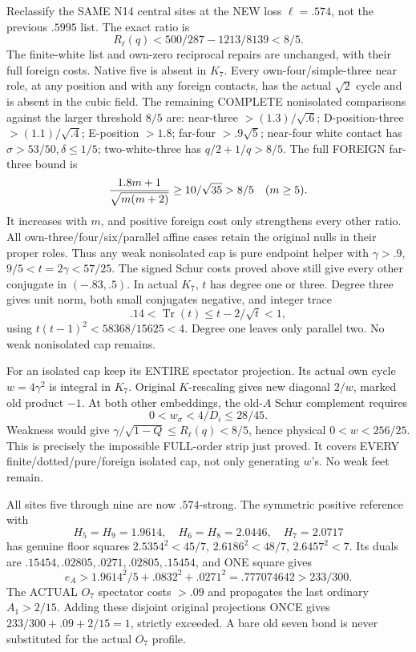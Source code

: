 \documentclass[11pt]{article}
\begin{document}
Reclassify the SAME N14 central sites at the
NEW loss \(\ell=.574\), not the previous
\(.5995\) list.
The exact ratio is
\[
 R_\ell(q)<500/287-1213/8139<8/5 .
\]
The finite-white list and own-zero reciprocal
repairs are unchanged, with their full foreign
costs.
Native five is absent in \(K_7\).
Every own-four/simple-three near role, at
any position and with any foreign contacts,
has the actual \(\sqrt2\) cycle and is absent
in the cubic field.
The remaining COMPLETE nonisolated comparisons
against the larger threshold \(8/5\) are:
near-three \(>(1.3)/\sqrt{.6}\);
D-position-three \(>(1.1)/\sqrt{.4}\);
E-position \(>1.8\);
far-four \(>.9\sqrt5\);
near-four white contact has
\(\sigma>53/50,\delta\le1/5\);
two-white-three has \(q/2+1/q>8/5\).
The full FOREIGN far-three bound is
\[
                {1.8m+1\over\sqrt{m(m+2)}}\ge10/\sqrt{35}>8/5
                    \quad(m\ge5).
\]
It increases with \(m\), and positive foreign
cost only strengthens every other ratio.
All own-three/four/six/parallel affine cases
retain the original nulls in their proper roles.
Thus any weak nonisolated cap is pure endpoint
helper with \(\gamma>.9\),
\(9/5<t=2\gamma<57/25\).
The signed Schur costs proved above still give
every other conjugate in \((-.83,.5)\).
In actual \(K_7\), \(t\) has degree one or three.
Degree three gives unit norm, both small
conjugates negative, and integer trace
\[
                      .14<\operatorname{Tr}(t)
                              \le t-2/\sqrt t<1,
\]
using \(t(t-1)^2<58368/15625<4\).
Degree one leaves only parallel two.
No weak nonisolated cap remains.

For an isolated cap keep its ENTIRE spectator
projection.
Its actual own cycle \(w=4\gamma^2\) is integral
in \(K_7\).
Original \(K\)-rescaling gives new diagonal
\(2/w\), marked old product \(-1\).
At both other embeddings, the old-\(A\)
Schur complement requires
\[
                       0<w_\sigma<4/D_i\le28/45 .
\]
Weakness would give
\(\gamma/\sqrt{1-Q}\le R_\ell(q)<8/5\),
hence physical \(0<w<256/25\).
This is precisely the impossible FULL-order
strip just proved.
It covers EVERY finite/dotted/pure/foreign
isolated cap, not only generating \(w\)'s.
No weak feet remain.

All sites five through nine are now
\(.574\)-strong.
The symmetric positive reference with
\[
 H_5=H_9=1.9614,\quad H_6=H_8=2.0446,\quad H_7=2.0717
\]
has genuine floor squares
\(2.5354^2<45/7\), \(2.6186^2<48/7\),
\(2.6457^2<7\).
Its duals are
\(.15454,.02805,.0271,.02805,.15454\),
and ONE square gives
\[
 e_A>1.9614^2/5+.0832^2+.0271^2
                         =.777074642>233/300 .
\]
The ACTUAL \(O_7\) spectator costs \(>.09\)
and propagates the last ordinary \(A_1>2/15\).
Adding these disjoint original projections
ONCE gives \(233/300+.09+2/15=1\), strictly
exceeded.
A bare old seven bond is never substituted
for the actual \(O_7\) profile.
\end{document}
